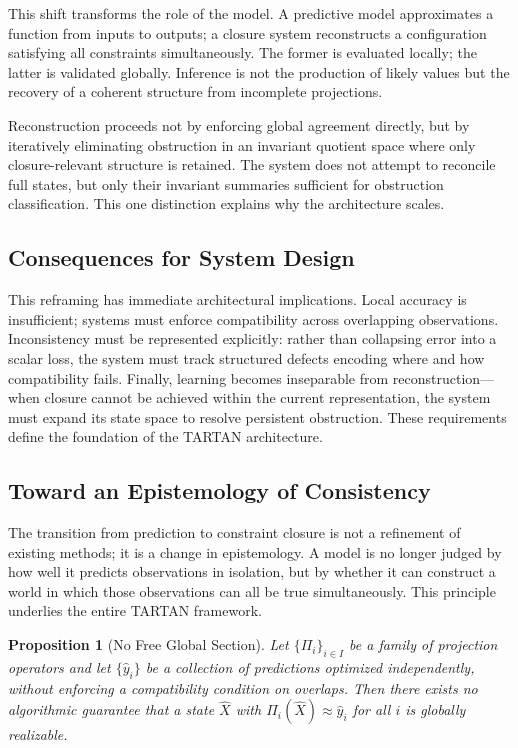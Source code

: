 \documentclass[12pt, oneside]{article}
\newtheorem{proposition}{Proposition}
\begin{document}
This shift transforms the role of the model. A predictive model approximates a function from inputs to outputs; a closure system reconstructs a configuration satisfying all constraints simultaneously. The former is evaluated locally; the latter is validated globally. Inference is not the production of likely values but the recovery of a coherent structure from incomplete projections.

Reconstruction proceeds not by enforcing global agreement directly, but by iteratively eliminating obstruction in an invariant quotient space where only closure-relevant structure is retained. The system does not attempt to reconcile full states, but only their invariant summaries sufficient for obstruction classification. This one distinction explains why the architecture scales.

\subsection{Consequences for System Design}

This reframing has immediate architectural implications. Local accuracy is insufficient; systems must enforce compatibility across overlapping observations. Inconsistency must be represented explicitly: rather than collapsing error into a scalar loss, the system must track structured defects encoding where and how compatibility fails. Finally, learning becomes inseparable from reconstruction---when closure cannot be achieved within the current representation, the system must expand its state space to resolve persistent obstruction. These requirements define the foundation of the TARTAN architecture.

\subsection{Toward an Epistemology of Consistency}

The transition from prediction to constraint closure is not a refinement of existing methods; it is a change in epistemology. A model is no longer judged by how well it predicts observations in isolation, but by whether it can construct a world in which those observations can all be true simultaneously. This principle underlies the entire TARTAN framework.

\begin{proposition}[No Free Global Section]
Let $\{\Pi_i\}_{i \in I}$ be a family of projection operators and let $\{\hat{y}_i\}$ be a collection of predictions optimized independently, without enforcing a compatibility condition on overlaps. Then there exists no algorithmic guarantee that a state $\hat{X}$ with $\Pi_i(\hat{X}) \approx \hat{y}_i$ for all $i$ is globally realizable.
\end{proposition}
\end{document}
